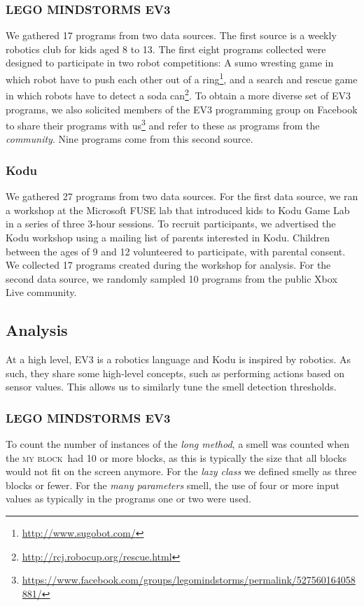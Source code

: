 \documentclass[conference]{IEEEtran}
\newcommand{\ms}{LEGO MINDSTORMS EV3}
\newcommand{\mb}{\textsc{my block}}
\begin{document}
\subsubsection{\ms}
We  gathered 17 programs from two data sources. The first source is a weekly robotics club for kids aged 8 to 13. The first eight programs collected were designed to participate in two robot competitions:  A sumo wresting game in which robot have to push each other out of a ring\footnote{\url{http://www.sugobot.com/}}, and a search and rescue game in which robots have to detect a soda can\footnote{\url{http://rcj.robocup.org/rescue.html}}. To obtain a more diverse set of EV3 programs, we also solicited members of the EV3 programming group on Facebook to share their programs with us\footnote{\url{https://www.facebook.com/groups/legomindstorms/permalink/527560164058881/}} and refer to these as programs from the \emph{community}. Nine programs come from this second source. 


\subsubsection{Kodu}
We gathered 27  programs from two data sources. 
For the first data source, we ran a workshop at the Microsoft FUSE lab that introduced kids to Kodu Game Lab in a series of three 3-hour sessions.  To recruit participants, we advertised the Kodu workshop using a mailing list of parents interested in Kodu.  
Children between the ages of 9 and 12 volunteered to participate, with parental consent. We collected 17 programs created during the workshop for analysis. 
For the second data source, we randomly sampled 10 programs from the public Xbox Live community. 



\subsection{Analysis}
At a high level, EV3 is a robotics language and Kodu is inspired by robotics. As such, they share some high-level concepts, such as performing actions based on sensor values. This allows us to similarly tune the smell detection thresholds. 

\subsubsection{\ms}
To count the number of instances of the \emph{long method}, a smell was counted when the \mb~had 10 or more blocks, as this is typically the size that all blocks would not fit on the screen anymore. For the \emph{lazy class} we defined smelly as three blocks or fewer. For the  \emph{many parameters} smell, the use of four or more input values as typically in the programs one or two were used.
\end{document}
